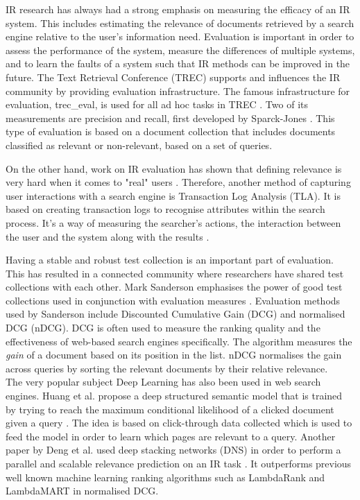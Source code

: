 IR research has always had a strong emphasis on measuring the efficacy of an IR system. This includes estimating the relevance of documents retrieved by a search engine relative to the user's information need. Evaluation is important in order to assess the performance of the system, measure the differences of multiple systems, and to learn the faults of a system such that IR methods can be improved in the future. The Text Retrieval Conference (TREC) supports and influences the IR community by providing evaluation infrastructure. The famous infrastructure for evaluation, trec\_eval, is used for all ad hoc tasks in TREC \cite{voorhees:evaluation}. Two of its measurements are precision and recall, first developed by Sparck-Jones \cite{jones1981information}. This type of evaluation is based on a document collection that includes documents classified as relevant or non-relevant, based on a set of queries.

On the other hand, work on IR evaluation has shown that defining relevance is very hard when it comes to "real" users \cite{mizzaro1997relevance}. Therefore, another method of capturing user interactions with a search engine is Transaction Log Analysis (TLA). It is based on creating transaction logs to recognise attributes within the search process. It's a way of measuring the searcher's actions, the interaction between the user and the system along with the results \cite{glaser1967discovery}. 

Having a stable and robust test collection is an important part of evaluation. This has resulted in a connected community where researchers have shared test collections with each other. Mark Sanderson emphasises the power of good test collections used in conjunction with evaluation measures \cite{sanderson:evaluation}. Evaluation methods used by Sanderson include Discounted Cumulative Gain (DCG) and normalised DCG (nDCG). DCG is often used to measure the ranking quality and the effectiveness of web-based search engines specifically. The algorithm measures the \textit{gain} of a document based on its position in the list. nDCG normalises the gain across queries by sorting the relevant documents by their relative relevance. \\

The very popular subject Deep Learning has also been used in web search engines. Huang et al. propose a deep structured semantic model that is trained by trying to reach the maximum conditional likelihood of a clicked document given a query \cite{huang2013learning}. The idea is based on click-through data collected which is used to feed the model in order to learn which pages are relevant to a query. Another paper by Deng et al. used deep stacking networks (DNS) in order to perform a parallel and scalable relevance prediction on an IR task \cite{deng2013deep}. It outperforms previous well known machine learning ranking algorithms such as LambdaRank and LambdaMART \cite{burges2010ranknet} in normalised DCG. 

